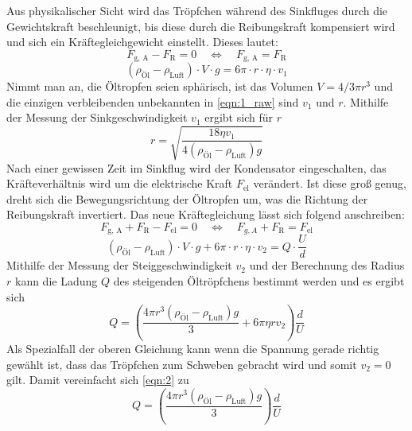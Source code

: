 Aus physikalischer Sicht wird das Tröpfchen während des Sinkfluges durch die Gewichtskraft beschleunigt, bis diese durch die Reibungskraft kompensiert wird und sich ein Kräftegleichgewicht einstellt. Dieses lautet: 
\begin{equation*}
	F_{\text{g, A}} - F_{\text{R}} = 0 \quad\Leftrightarrow\quad F_{\text{g, A}} = F_{\text{R}}
\end{equation*}
\begin{equation}
	\label{eqn:1_raw}
	(\rho_{\text{Öl}} - \rho_{\text{Luft}}) \cdot V \cdot g = 6 \pi \cdot r \cdot \eta \cdot v_1
\end{equation}
Nimmt man an, die Öltropfen seien sphärisch, ist das Volumen \( V = 4/3 \pi r^3 \) und die einzigen verbleibenden unbekannten in \autoref{eqn:1_raw} sind \( v_1 \) und \( r \). Mithilfe der Messung der Sinkgeschwindigkeit $v_1$ ergibt sich für \( r \)
\begin{equation}
	\label{eqn:1}
	r = \sqrt{\frac{18\eta v_1}{4(\rho_{\text{Öl}} - \rho_{\text{Luft}}) g}}
\end{equation}
Nach einer gewissen Zeit im Sinkflug wird der Kondensator eingeschalten, das Kräfteverhältnis wird um die elektrische Kraft $F_{\text{el}}$ verändert. Ist diese groß genug, dreht sich die Bewegungsrichtung der Öltropfen um, was die Richtung der Reibungskraft invertiert. Das neue Kräftegleichung lässt sich folgend anschreiben: 
\begin{equation*}
	F_{\text{g, A}} + F_{\text{R}} - F_{\text{el}} = 0 \quad\Leftrightarrow\quad F_{g,A} + F_{\text{R}} = F_{\text{el}}
\end{equation*}
\begin{equation}
	(\rho_{\text{Öl}} - \rho_{\text{Luft}}) \cdot V \cdot g + 6 \pi \cdot r \cdot \eta \cdot v_{2} = Q \cdot \frac{U}{d}
\end{equation}
Mithilfe der Messung der Steiggeschwindigkeit $v_2$ und der Berechnung des Radius \( r \) kann die Ladung \( Q \) des steigenden Öltröpfchens bestimmt werden und es ergibt sich
\begin{equation}
	\label{eqn:2}
	Q = \left(\frac{4\pi r^3(\rho_{\text{Öl}} - \rho_{\text{Luft}}) g}{3} + 6\pi\eta rv_2 \right) \frac{d}{U}
\end{equation} 
Als Spezialfall der oberen Gleichung kann wenn die Spannung gerade richtig gewählt ist, dass das Tröpfchen zum Schweben gebracht wird und somit \( v_2 = 0 \) gilt. Damit vereinfacht sich \autoref{eqn:2} zu 
\begin{equation}
	Q = \left(\frac{4\pi r^3(\rho_{\text{Öl}} - \rho_{\text{Luft}}) g}{3} \right) \frac{d}{U}
\end{equation}
